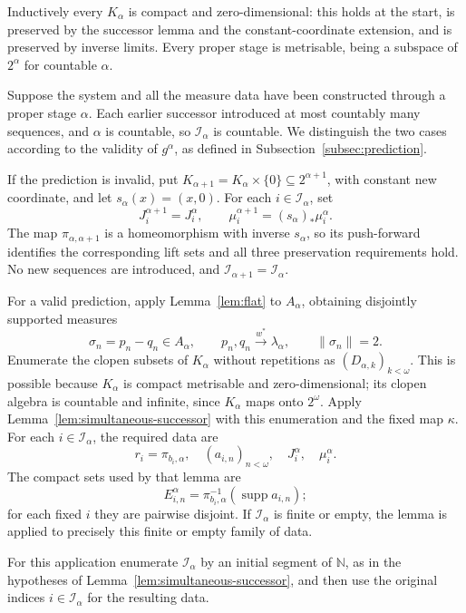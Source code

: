 \documentclass[a4paper,11pt]{amsart}
\theoremstyle{plain}
\theoremstyle{definition}
\theoremstyle{remark}
\newcommand{\N}{\mathbb N}
\newcommand{\supp}{\operatorname{supp}}
\numberwithin{equation}{section}
\begin{document}
Inductively every $K_\alpha$ is compact and zero-dimensional: this holds at the start, is preserved by the successor lemma and the constant-coordinate extension, and is preserved by inverse limits. Every proper stage is metrisable, being a subspace of $2^\alpha$ for countable $\alpha$.

Suppose the system and all the measure data have been constructed through a proper stage $\alpha$.  Each earlier successor introduced at most countably many sequences, and $\alpha$ is countable, so $\mathcal I_\alpha$ is countable.  We distinguish the two cases according to the validity of $g^\alpha$, as defined in Subsection~\ref{subsec:prediction}.

If the prediction is invalid, put $K_{\alpha+1}=K_\alpha\times\{0\}\subseteq2^{\alpha+1}$, with constant new coordinate, and let $s_\alpha(x)=(x,0)$.  For each $i\in\mathcal I_\alpha$, set
\[
 J_i^{\alpha+1}=J_i^\alpha,
 \qquad \mu_i^{\alpha+1}=(s_\alpha)_*\mu_i^\alpha.
\]
The map $\pi_{\alpha,\alpha+1}$ is a homeomorphism with inverse $s_\alpha$, so its push-forward identifies the corresponding lift sets and all three preservation requirements hold.  No new sequences are introduced, and $\mathcal I_{\alpha+1}=\mathcal I_\alpha$.

For a valid prediction, apply Lemma~\ref{lem:flat} to $A_\alpha$, obtaining disjointly supported measures
\[
 \sigma_n=p_n-q_n\in A_\alpha,
 \qquad p_n,q_n\xrightarrow{w^*}\lambda_\alpha,
 \qquad\|\sigma_n\|=2.
\]
Enumerate the clopen subsets of $K_\alpha$ without repetitions as $(D_{\alpha,k})_{k<\omega}$.  This is possible because $K_\alpha$ is compact metrisable and zero-dimensional; its clopen algebra is countable and infinite, since $K_\alpha$ maps onto $2^\omega$.  Apply Lemma~\ref{lem:simultaneous-successor} with this enumeration and the fixed map $\kappa$.  For each $i\in\mathcal I_\alpha$, the required data are
\[
 r_i=\pi_{b_i,\alpha},\quad
 (a_{i,n})_{n<\omega},\quad J_i^\alpha,\quad\mu_i^\alpha.
\]
The compact sets used by that lemma are
\[
 E_{i,n}^\alpha=
 \pi_{b_i,\alpha}^{-1}(\supp a_{i,n});
\]
for each fixed $i$ they are pairwise disjoint.  If $\mathcal I_\alpha$ is finite or empty, the lemma is applied to precisely this finite or empty family of data.

For this application enumerate $\mathcal I_\alpha$ by an initial segment of $\N$, as in the hypotheses of Lemma~\ref{lem:simultaneous-successor}, and then use the original indices $i\in\mathcal I_\alpha$ for the resulting data.
\end{document}
